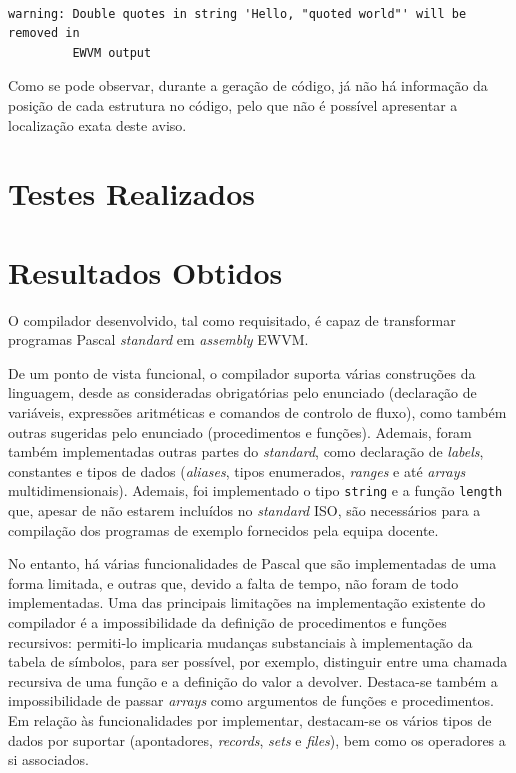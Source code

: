 \documentclass[12pt, a4paper]{article}
\begin{document}
\begin{lstlisting}

warning: Double quotes in string 'Hello, "quoted world"' will be removed in
         EWVM output
\end{lstlisting}

Como se pode observar, durante a geração de código, já não há informação da posição de cada
estrutura no código, pelo que não é possível apresentar a localização exata deste aviso.

\section{Testes Realizados}

\section{Resultados Obtidos}

O compilador desenvolvido, tal como requisitado, é capaz de transformar programas Pascal
\emph{standard} em \emph{assembly} EWVM.

De um ponto de vista funcional, o compilador suporta várias construções da linguagem, desde as
consideradas obrigatórias pelo enunciado (declaração de variáveis, expressões aritméticas e comandos
de controlo de fluxo), como também outras sugeridas pelo enunciado (procedimentos e funções).
Ademais, foram também implementadas outras partes do \emph{standard}, como declaração de
\emph{labels}, constantes e tipos de dados (\emph{aliases}, tipos enumerados, \emph{ranges} e até
\emph{arrays} multidimensionais). Ademais, foi implementado o tipo \texttt{string} e a função
\texttt{length} que, apesar de não estarem incluídos no \emph{standard} ISO, são necessários para a
compilação dos programas de exemplo fornecidos pela equipa docente.

No entanto, há várias funcionalidades de Pascal que são implementadas de uma forma limitada, e
outras que, devido a falta de tempo, não foram de todo implementadas. Uma das principais limitações
na implementação existente do compilador é a impossibilidade da definição de procedimentos e funções
recursivos: permiti-lo implicaria mudanças substanciais à implementação da tabela de símbolos, para
ser possível, por exemplo, distinguir entre uma chamada recursiva de uma função e a definição do
valor a devolver. Destaca-se também a impossibilidade de passar \emph{arrays} como argumentos de
funções e procedimentos. Em relação às funcionalidades por implementar, destacam-se os vários tipos
de dados por suportar (apontadores, \emph{records}, \emph{sets} e \emph{files}), bem como os
operadores a si associados.
\end{document}
